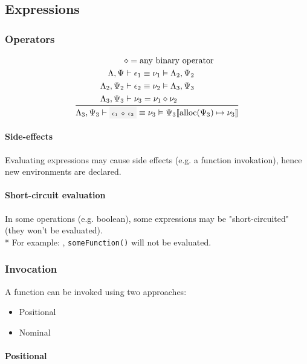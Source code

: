 \clearpage

\subsection{Expressions}

\subsubsection{Operators}

\[
	\oprule[aligned]{
		&\bop = \text{any binary operator} \\*
		\EnvLoc,\EnvStore     &\then \expr_1 \eval \val_1 \Then \EnvLoc_2,\EnvStore_2 \\*
		\EnvLoc_2,\EnvStore_2 &\then \expr_2 \eval \val_2 \Then \EnvLoc_3,\EnvStore_3 \\*
		\EnvLoc_3,\EnvStore_3 &\then \val_3 = \val_1 \bop \val_2 \\*
	}{
		\EnvLoc_3,\EnvStore_3\then \code{$\expr_1$ $\bop$ $\expr_2$} \eval \val_3 \Then \EnvStore_3\env{\alloc(\EnvStore_3) \mapsto \val_3}
	}
\]

\paragraph{Side-effects} Evaluating expressions may cause side effects (e.g.
a function invokation), hence new environments are declared.

\paragraph{Short-circuit evaluation} In some operations (e.g. boolean), some
expressions may be "short-circuited" (they won't be evaluated).\\*
For example: , \texttt{someFunction()} will not
be evaluated.


\subsubsection{Invocation}

A function can be invoked using two approaches:
\begin{itemize}
	\item Positional 
	\item Nominal 
\end{itemize}

\paragraph{Positional}

